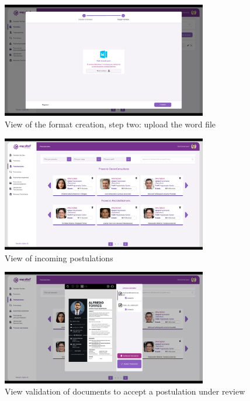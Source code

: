 \documentclass{scrreprt}
\begin{document}
\begin{figure}[H]
	\centering \small
	\includegraphics[width=0.8\textwidth]{WebPrototype/wflow-25-2.jpg}
	\caption{View of the format creation, step two: upload the word file}
\end{figure}

\begin{figure}[H]
	\centering \small
	\includegraphics[width=0.8\textwidth]{WebPrototype/wflow-26.jpeg}
	\caption{View of incoming postulations}
\end{figure}

\begin{figure}[H]
	\centering \small
	\includegraphics[width=0.8\textwidth]{WebPrototype/wflow-27.jpeg}
	\caption{View validation of documents to accept a postulation under review}
\end{figure}
\end{document}
